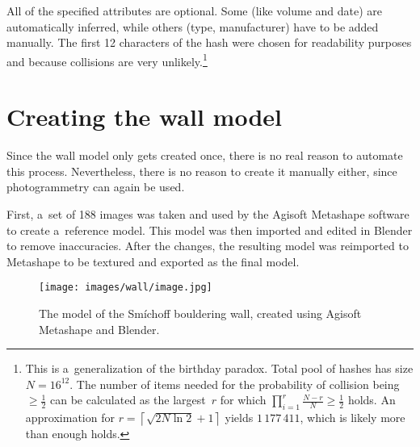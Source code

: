 All of the specified attributes are optional.
Some (like volume and date) are automatically inferred, while others (type, manufacturer) have to be added manually.
The first 12 characters of the hash were chosen for readability purposes and because collisions are very unlikely.\footnote{This is a~generalization of the birthday paradox. Total pool of hashes has size $N = 16^{12}$. The number of items needed for the probability of collision being $\ge \frac{1}{2}$ can be calculated as the largest~$r$ for which $\prod_{i = 1}^{r} \frac{N - r}{N} \ge \frac{1}{2}$ holds. An approximation for $r = \left\lceil \sqrt{2N \ln 2} + 1 \right\rceil$ \cite{brink2012probably} yields $1\,177\,411$, which is likely more than enough holds.}

\section{Creating the wall model}
Since the wall model only gets created once, there is no real reason to automate this process.
Nevertheless, there is no reason to create it manually either, since photogrammetry can again be used.

First, a~set of 188 images was taken and used by the Agisoft Metashape software to create a~reference model.
This model was then imported and edited in Blender to remove inaccuracies.
After the changes, the resulting model was reimported to Metashape to be textured and exported as the final model.

\begin{figure}[h]
	\centering
	\texttt{[image: images/wall/image.jpg]}
	\caption{The model of the Smíchoff bouldering wall, created using Agisoft Metashape and Blender.}
	\label{fig:model}
\end{figure}

